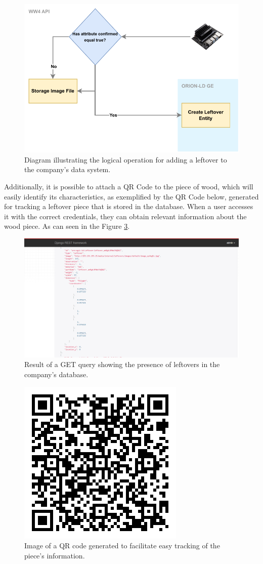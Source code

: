 \begin{figure}[!ht]
    \centering
    \includegraphics[width=0.65\linewidth]{images/chap5/Storage.pdf}
    \caption{Diagram illustrating the logical operation for adding a leftover to the company's data system.}
    \label{fig:database-diagram}
\end{figure}

Additionally, it is possible to attach a QR Code to the piece of wood, which will easily identify its characteristics, as exemplified by the QR Code below, generated for tracking a leftover piece that is stored in the database. When a user accesses it with the correct credentials, they can obtain relevant information about the wood piece. As can seen in the Figure \ref{fig:database-storage}.
\begin{figure}[H]
    \centering
    \includegraphics[width=0.65\linewidth]{images/chap5/leftover-storage.png}
    \caption{Result of a GET query showing the presence of leftovers in the company's database.}
    \label{fig:database-storage-qr}
\end{figure}



\begin{figure}[!ht]
    \centering
    \includegraphics[width=0.35\linewidth]{images/chap5/adobe_express.png}
    \caption{Image of a QR code generated to facilitate easy tracking of the piece's information.}
    \label{fig:database-storage}
\end{figure}

